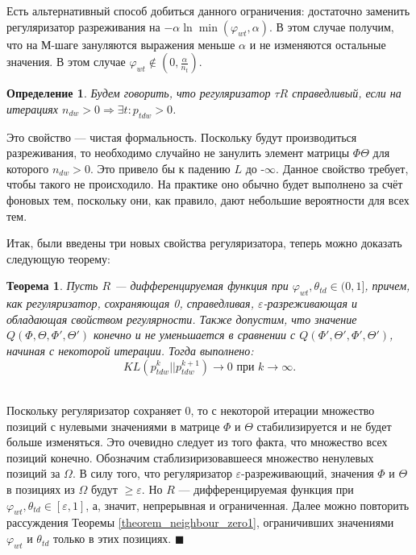 \documentclass[12pt]{article}
\newtheorem{definition}{Определение}[section]
\newtheorem{theorem}{Теорема}
\newenvironment{Proof} 
	{\par\noindent{\bf Доказательство.}} 
	{\hfill$\blacksquare$}
\renewcommand{\geq}{\geqslant}
\renewcommand{\phi}{\varphi}
\begin{document}
Есть альтернативный способ добиться данного ограничения: достаточно заменить регуляризатор разреживания на $-\alpha \ln \min(\phi_{wt}, \alpha)$. В этом случае получим, что на М-шаге зануляются выражения меньше $\alpha$ и не изменяются остальные значения. В этом случае $\phi_{wt}\notin (0, \frac{\alpha}{n_t})$.
\begin{definition}
\label{fairreg}
Будем говорить, что регуляризатор $\tau R$ справедливый, если на итерациях $n_{dw} > 0 \Rightarrow \exists t\colon p_{tdw} > 0$.
\end{definition}

Это свойство --- чистая формальность. Поскольку будут производиться разреживания, то необходимо случайно не занулить элемент матрицы $\Phi \Theta$ для которого $n_{dw} > 0$. Это привело бы к падению $L$ до -$\infty$.  Данное свойство требует, чтобы такого не происходило. На практике оно обычно будет выполнено за счёт фоновых тем\cite{vorontsov2014tutorial}, поскольку они, как правило, дают небольшие вероятности для всех тем.

Итак, были введены три новых свойства регуляризатора, теперь можно доказать следующую теорему:

\begin{theorem} \label{theorem_neighbour_zero2} Пусть $R$ --- дифференцируемая функция при $\phi_{wt}, \theta_{td} \in (0, 1]$, причем, как регуляризатор, сохраняющая 0, справедливая, $\varepsilon$-разреживающая и обладающая свойством регулярности. Также допустим,  что значение $Q(\Phi, \Theta, \Phi', \Theta')$ конечно и не уменьшается в сравнении с $Q(\Phi', \Theta', \Phi', \Theta')$, начиная с некоторой итерации. Тогда выполнено:
\[
KL(p_{tdw}^{k}||p_{tdw}^{k+1}) \to 0 \text{ при } k \to \infty.
\]
\end{theorem}
\begin{Proof}\ \\
Поскольку регуляризатор сохраняет 0, то с некоторой итерации множество позиций с нулевыми значениями в матрице $\Phi$ и $\Theta$ стабилизируется и не будет больше изменяться. Это очевидно следует из того факта, что  множество всех позиций конечно. Обозначим стаблизиризовавшееся множество ненулевых позиций за $\Omega$. В силу того, что регуляризатор $\varepsilon$-разреживающий, значения $\Phi$ и $\Theta$ в позициях из $\Omega$ будут $\geq \varepsilon$. Но $R$ --- дифференцируемая функция при $\phi_{wt}, \theta_{td} \in [\varepsilon, 1]$, а, значит, непрерывная и ограниченная. Далее можно повторить рассуждения Теоремы \ref{theorem_neighbour_zero1}, ограничивших значениями $\phi_{wt}$ и $\theta_{td}$ только в этих позициях. 
\end{Proof}
\end{document}
